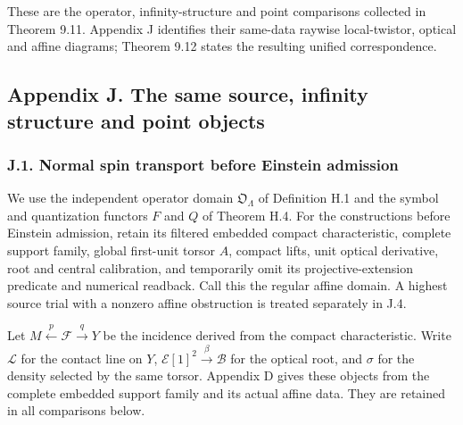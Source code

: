 \documentclass[
  english,
  11pt,
  reqno]{amsart}
\begin{document}
These are the operator, infinity-structure and point comparisons
collected in Theorem 9.11. Appendix J identifies their same-data raywise
local-twistor, optical and affine diagrams; Theorem 9.12 states the
resulting unified correspondence.

\protect{}\label{app:gg-simultaneous-projective-comparison}

\subsection{Appendix J. The same source, infinity structure and point
objects}\label{appendix-j.-the-same-source-infinity-structure-and-point-objects}

\protect{}\label{sec:gg-derived-ward-construction}

\subsubsection{J.1. Normal spin transport before Einstein
admission}\label{j.1.-normal-spin-transport-before-einstein-admission}

We use the independent operator domain \(\mathfrak O_\Lambda\) of
Definition H.1 and the symbol and quantization functors \(F\) and \(Q\)
of Theorem H.4. For the constructions before Einstein admission, retain
its filtered embedded compact characteristic, complete support family,
global first-unit torsor \(A\), compact lifts, unit optical derivative,
root and central calibration, and temporarily omit its
projective-extension predicate and numerical readback. Call this the
regular affine domain. A highest source trial with a nonzero affine
obstruction is treated separately in J.4.

Let \(M\xleftarrow{p}\mathcal F\xrightarrow{q}Y\) be the incidence
derived from the compact characteristic. Write \(\mathcal L\) for the
contact line on \(Y\), \(\mathcal E[1]^2\xrightarrow{\beta}\mathcal B\)
for the optical root, and \(\sigma\) for the density selected by the
same torsor. Appendix D gives these objects from the complete embedded
support family and its actual affine data. They are retained in all
comparisons below.
\end{document}
